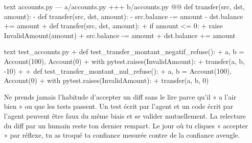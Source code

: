 \begin{extraitcode}{text}
  accounts.py
  --- a/accounts.py
  +++ b/accounts.py
@@ def transfer(src, dst, amount):
-     def transfer(src, dst, amount):
-         src.balance -= amount
-         dst.balance += amount
+     def transfer(src, dst, amount):
+         if amount <= 0:
+             raise InvalidAmount(amount)
+         src.balance -= amount
+         dst.balance += amount
\end{extraitcode}



\begin{extraitcode}{text}
  test_accounts.py
+ def test_transfer_montant_negatif_refuse():
+     a, b = Account(100), Account(0)
+     with pytest.raises(InvalidAmount):
+         transfer(a, b, -10)
+
+ def test_transfer_montant_nul_refuse():
+     a, b = Account(100), Account(0)
+     with pytest.raises(InvalidAmount):
+         transfer(a, b, 0)
\end{extraitcode}


\begin{liste}
\end{liste}

\begin{avertissement}
Ne prends jamais l'habitude d'accepter un diff sans le lire parce qu'il « a
l'air bien » ou que les tests passent. Un test écrit par l'agent et un code
écrit par l'agent peuvent être faux du même biais et se valider mutuellement.
La relecture du diff par un humain reste ton dernier rempart. Le jour où tu
cliques « accepter » par réflexe, tu as troqué ta confiance mesurée contre de
la confiance aveugle.
\end{avertissement}

